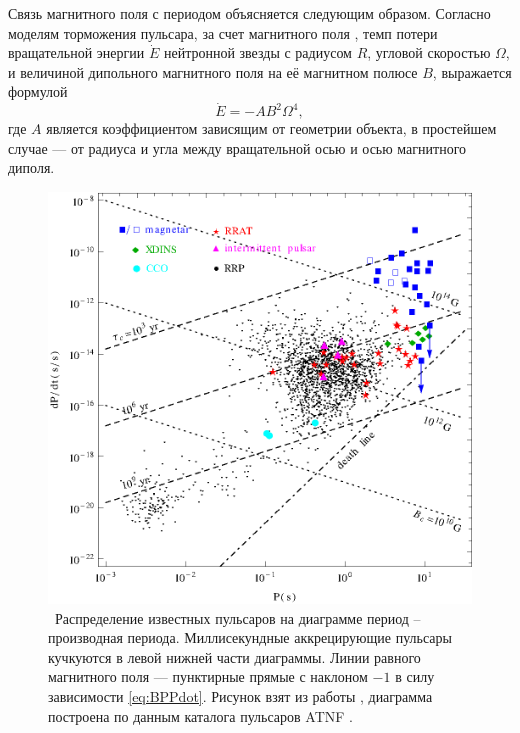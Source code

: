 \documentclass[14pt,a4paper]{extarticle}
\begin{document}
			Связь магнитного поля с периодом объясняется следующим образом.
			Согласно моделям торможения пульсара, за счет магнитного поля \cite{Malov2004}, темп потери вращательной энергии $\dot{E}$
			нейтронной звезды с радиусом  $R$, 
			угловой скоростью $\Omega$, 
			и величиной дипольного магнитного поля на её магнитном полюсе $B$, выражается формулой
			\begin{equation}\label{loss}
				\dot{E} = -AB^2\Omega^4,
			\end{equation}
			где $A$ является коэффициентом зависящим от геометрии объекта, в простейшем случае --- от радиуса и угла между вращательной осью и осью магнитного диполя.
			\begin{figure}[H]
				\centering
				\includegraphics[scale=0.99]{PPdot_PSRLikeObjects.eps}
				\caption{\small\
				Распределение известных пульсаров на диаграмме период -- производная периода. Миллисекундные аккрецирующие пульсары кучкуются в левой нижней части диаграммы.  Линии равного магнитного поля --- пунктирные прямые с наклоном $-1$
				в силу зависимости \eqref{eq:BPPdot}.
				Рисунок взят из работы \cite{Tong2014}, диаграмма построена по данным каталога пульсаров ATNF \cite{ATNF}.
				}\label{fig:PPdot}
			\end{figure}
\end{document}
